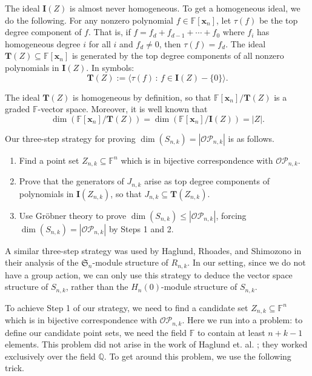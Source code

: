 \documentclass[ALCO,ThmDefs,published]{cedram}
\newcommand{\symm}{{\mathfrak{S}}}
\newcommand{\QQ}{{\mathbb {Q}}}
\newcommand{\xx}{{\mathbf {x}}}
\newcommand{\FF}{{\mathbb{F}}}
\theoremstyle{plain}
\newcommand{\symm}{{\mathfrak{S}}}
\newcommand{\QQ}{{\mathbb {Q}}}
\newcommand{\OP}{{\mathcal{OP}}}
\newcommand{\FF}{{\mathbb{F}}}
\newcommand{\xx}{{\mathbf {x}}}
\newcommand{\II}{{\mathbf {I}}}
\newcommand{\TT}{{\mathbf {T}}}
\begin{document}
The ideal $\II(Z)$ is almost never homogeneous.  To get a homogeneous ideal, we do the following.
For any nonzero polynomial $f \in \FF[\xx_n]$, let $\tau(f)$ be the top degree component of $f$.  That 
is, if $f = f_d + f_{d-1} + \cdots + f_0$ where $f_i$ has homogeneous degree $i$ for all $i$ and $f_d \neq 0$, then
$\tau(f) = f_d$.  The ideal $\TT(Z) \subseteq \FF[\xx_n]$ is generated by the top degree components of all
nonzero polynomials in $\II(Z)$.  In symbols:
\begin{equation}
\TT(Z) := \langle \tau(f) \,:\, f \in \II(Z) - \{0\} \rangle.
\end{equation}

The ideal $\TT(Z)$ is homogeneous by definition, so that ${\FF[\xx_n]} / {\TT(Z)}$ is a graded $\FF$-vector space.
Moreover, it is well known that
\begin{equation}
\dim \left( {\FF[\xx_n]} / {\TT(Z)} \right) = \dim \left( {\FF[\xx_n]} / {\II(Z)} \right) = |Z|.
\end{equation}


Our three-step strategy for proving $\dim(S_{n,k}) = |\OP_{n,k}|$ is as follows.

\begin{enumerate}
\item  Find a  point set $Z_{n,k} \subseteq \FF^n$ which is in bijective correspondence with $\OP_{n,k}$.
\item  Prove that the generators of $J_{n,k}$ arise as top degree components of polynomials in $\II(Z_{n,k})$,
so that $J_{n,k} \subseteq \TT(Z_{n,k})$.
\item Use Gr\"obner theory to prove $\dim(S_{n,k}) \leq |\OP_{n,k}|$, forcing $\dim(S_{n,k}) = |\OP_{n,k}|$
by Steps 1 and 2.
\end{enumerate}

A similar three-step strategy was used by Haglund, Rhoades, and Shimozono \cite{HRS} 
in their analysis of the  $\symm_n$-module structure of $R_{n,k}$.
In our setting, since we do not have a group action, we can only use this strategy to deduce the  vector
space structure of $S_{n,k}$, rather than the $H_n(0)$-module structure of $S_{n,k}$.

To achieve Step 1 of our strategy, we need to find a candidate set $Z_{n,k} \subseteq \FF^n$ which is in bijective
correspondence with $\OP_{n,k}$.  Here we run into a problem:  to define our candidate point sets, we need the 
field $\FF$ to contain at least $n+k-1$ elements.  This problem did not arise in the work of Haglund et. al. \cite{HRS};
they worked exclusively over the field $\QQ$.  To get around this problem, we use the following  trick.
\end{document}
